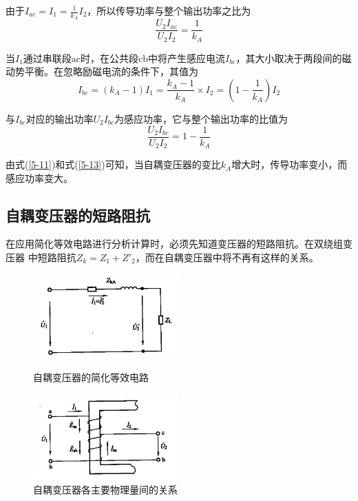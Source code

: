 \documentclass{book}
\begin{document}
由于${{I}_{ac}}={{I}_{1}}=\frac{1}{{{k}_{A}}}{{I}_{2}}$，所以传导功率与整个输出功率之比为
\begin{equation}
\frac{{{U}_{2}}{{I}_{ac}}}{{{U}_{2}}{{I}_{2}}}=\frac{1}{{{k}_{A}}}
\label{5-11}
\end{equation}

当${{I}_{1}}$通过串联段ac时，在公共段cb中将产生感应电流${{I}_{bc}}$，其大小取决于两段间的磁动势平衡。在忽略励磁电流的条件下，其值为
\begin{equation}
{{I}_{bc}}=\left( {{k}_{A}}-1 \right){{I}_{1}}=\frac{{{k}_{A}}-1}{{{k}_{A}}}\times {{I}_{2}}=\left( 1-\frac{1}{{{k}_{A}}} \right){{I}_{2}}
\label{5-12}
\end{equation}

与${{I}_{bc}}$对应的输出功率${{U}_{2}}{{I}_{bc}}$为感应功率，它与整个输出功率的比值为
\begin{equation}
\frac{{{U}_{2}}{{I}_{bc}}}{{{U}_{2}}{{I}_{2}}}=1-\frac{1}{{{k}_{A}}}
\label{5-13}
\end{equation}

由式(\ref{5-11})和式(\ref{5-13})可知，当自耦变压器的变比${{k}_{A}}$增大时，传导功率变小，而感应功率变大。

\subsection{自耦变压器的短路阻抗}

在应用简化等效电路进行分析计算时，必须先知道变压器的短路阻抗。在双绕组变压器 中短路阻抗${{Z}_{k}}={{Z}_{1}}+{{{Z}'}_{2}}$，而在自耦变压器中将不再有这样的关系。


\begin{figure}  
	\begin{minipage}[H]{0.45\linewidth}  
		\centering  
		\includegraphics[width=2.2in]{5-3.png}  
		\caption{自耦变压器的简化等效电路}  
		\label{fig:5-3}  
	\end{minipage}
	\begin{minipage}[H]{0.45\linewidth}  
		\centering  
		\includegraphics[width=2.2in]{5-4.png}  
		\caption{自耦变压器各主要物理量间的关系}  
		\label{fig:5-4}  
	\end{minipage}  
\end{figure}
\end{document}
